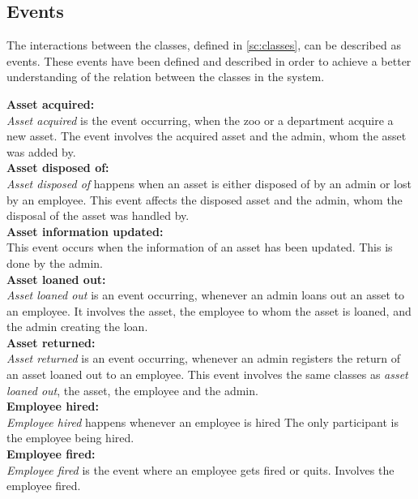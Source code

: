 \subsection{Events}\label{ssc:events}
The interactions between the classes, defined in \autoref{sc:classes}, can be described as events. These events have been defined and described in order to achieve a better understanding of the relation between the classes in the system.
\par

\textbf{Asset acquired:}\\
\textit{Asset acquired} is the event occurring, when the zoo or a department acquire a new asset. The event involves the acquired asset and the admin, whom the asset was added by.\\

\textbf{Asset disposed of:}\\
\textit{Asset disposed of} happens when an asset is either disposed of by an admin or lost by an employee. This event affects the disposed asset and the admin, whom the disposal of the asset was handled by.\\

\textbf{Asset information updated:}\\
This event occurs when the information of an asset has been updated. This is done by the admin.\\

\textbf{Asset loaned out:}\\
\textit{Asset loaned out} is an event occurring, whenever an admin loans out an asset to an employee. It involves the asset, the employee to whom the asset is loaned, and the admin creating the loan.\\

\textbf{Asset returned:}\\
\textit{Asset returned} is an event occurring, whenever an admin registers the return of an asset loaned out to an employee. This event involves the same classes as \textit{asset loaned out}, the asset, the employee and the admin.\\

\textbf{Employee hired:}\\
\textit{Employee hired} happens whenever an employee is hired The only participant is the employee being hired.\\

\textbf{Employee fired:}\\
\textit{Employee fired} is the event where an employee gets fired or quits. Involves the employee fired.\\

